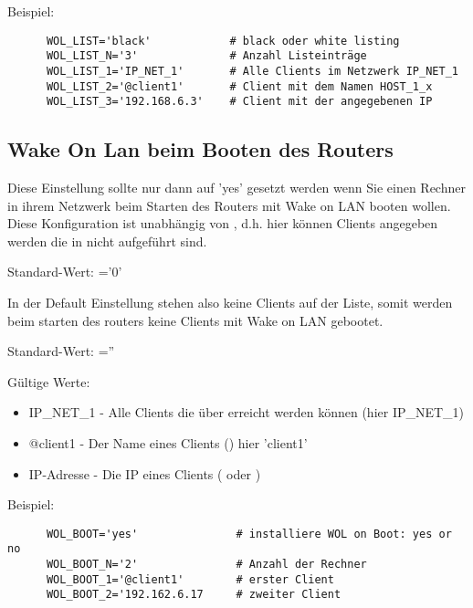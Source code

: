 \begin{description}
Beispiel:
\begin{example}
\begin{verbatim}
      WOL_LIST='black'            # black oder white listing
      WOL_LIST_N='3'              # Anzahl Listeinträge
      WOL_LIST_1='IP_NET_1'       # Alle Clients im Netzwerk IP_NET_1
      WOL_LIST_2='@client1'       # Client mit dem Namen HOST_1_x
      WOL_LIST_3='192.168.6.3'    # Client mit der angegebenen IP
\end{verbatim}
\end{example}

\end{description}

\subsection{Wake On Lan beim Booten des Routers}
\begin{description}


Diese Einstellung sollte nur dann auf 'yes' gesetzt werden wenn Sie einen
Rechner in ihrem Netzwerk beim Starten des Routers mit Wake on LAN booten
wollen. Diese Konfiguration ist unabhängig von , d.h. hier können
Clients angegeben werden die in  nicht aufgeführt sind.


	Standard-Wert:  ='0'

	In der Default Einstellung stehen also keine Clients auf der Liste, somit werden
	beim starten des routers keine Clients mit Wake on LAN gebootet.


	Standard-Wert:  =''

	Gültige Werte:
	\begin{itemize}
		\item IP\_NET\_1   - Alle Clients die über  erreicht werden können (hier IP\_NET\_1)
		\item @client1     - Der Name eines Clients () hier 'client1'
		\item IP-Adresse   - Die IP eines Clients ( oder )
	\end{itemize}

Beispiel:
\begin{example}
\begin{verbatim}
      WOL_BOOT='yes'               # installiere WOL on Boot: yes or no
      WOL_BOOT_N='2'               # Anzahl der Rechner
      WOL_BOOT_1='@client1'        # erster Client
      WOL_BOOT_2='192.162.6.17     # zweiter Client
\end{verbatim}
\end{example}

\end{description}

